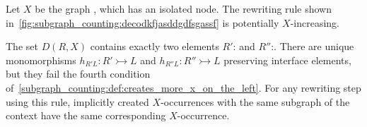 \begin{example}
    \label{subgraph_counting:ex:cond4_necessaire} 
    Let $X$ be the graph 
    , which has an isolated node. The rewriting rule shown in~\autoref{fig:subgraph_counting:decodkfjasddgdfsgassf} is potentially $X$-increasing.
    \begin{figure}[!htbp]
        \centering
        \caption{}
        \label{fig:subgraph_counting:decodkfjasddgdfsgassf}
    \end{figure}
    The set \( D(R,X) \) contains exactly two elements $R'$:
     and $R''$:. 
    There are unique monomorphisms $h_{R'L}:R' \rightarrowtail L$ and $h_{R''L}:R'' \rightarrowtail L$ preserving interface elements, but they fail the fourth condition of~\autoref{subgraph_counting:def:creates_more_x_on_the_left}.
    For any rewriting step using this rule, implicitly created $X$-occurrences with the same subgraph of the context have the same corresponding $X$-occurrence.
\end{example}


